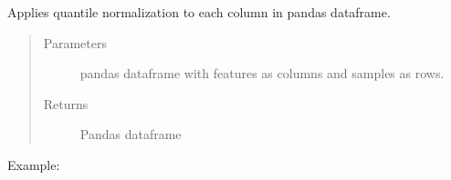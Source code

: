 \documentclass[letterpaper,10pt,english]{sphinxmanual}
\begin{document}
\begin{fulllineitems}
\label{\detokenize{_autosummary/analytics_core.analytics:analytics_core.analytics.analytics.quantile_normalization}}
Applies quantile normalization to each column in pandas dataframe.
\begin{quote}\begin{description}
\item[{Parameters}] \leavevmode
{} \textendash{} pandas dataframe with features as columns and samples as rows.

\item[{Returns}] \leavevmode
Pandas dataframe

\end{description}\end{quote}

Example:

\begin{sphinxVerbatim}[commandchars=\\\{\}]
  
\end{sphinxVerbatim}

\end{fulllineitems}

\end{document}
